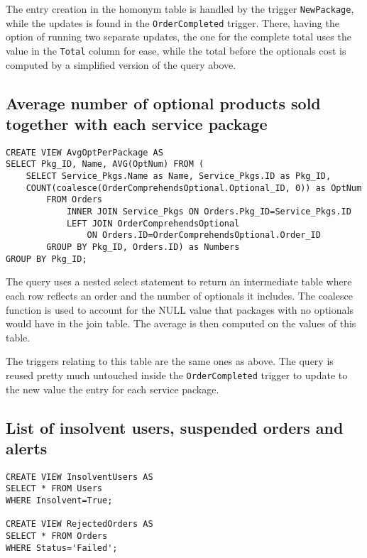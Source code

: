 The entry creation in the homonym table is handled by the trigger \texttt{NewPackage}, while the updates is found in the \texttt{OrderCompleted} trigger. There, having the option of running two separate updates, the one for the complete total uses the value in the \texttt{Total} column for ease, while the total before the optionals cost is computed by a simplified version of the query above.

\subsection{Average number of optional products sold together with each service package}

\begin{lstlisting}[style=SQL]
CREATE VIEW AvgOptPerPackage AS
SELECT Pkg_ID, Name, AVG(OptNum) FROM (
    SELECT Service_Pkgs.Name as Name, Service_Pkgs.ID as Pkg_ID,
    COUNT(coalesce(OrderComprehendsOptional.Optional_ID, 0)) as OptNum
        FROM Orders
            INNER JOIN Service_Pkgs ON Orders.Pkg_ID=Service_Pkgs.ID
            LEFT JOIN OrderComprehendsOptional
                ON Orders.ID=OrderComprehendsOptional.Order_ID
        GROUP BY Pkg_ID, Orders.ID) as Numbers
GROUP BY Pkg_ID;
\end{lstlisting}

The query uses a nested select statement to return an intermediate table where each row reflects an order and the number of optionals it includes.
The coalesce function is used to account for the NULL value that packages with no optionals would have in the join table. The average is then computed on the values of this table.

The triggers relating to this table are the same ones as above. The query is reused pretty much untouched inside the \texttt{OrderCompleted}
trigger to update to the new value the entry for each service package.

\subsection{List of insolvent users, suspended orders and alerts}

\begin{lstlisting}[style=SQL]
CREATE VIEW InsolventUsers AS
SELECT * FROM Users
WHERE Insolvent=True;

CREATE VIEW RejectedOrders AS
SELECT * FROM Orders
WHERE Status='Failed';
\end{lstlisting}

